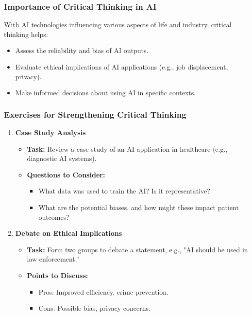 \documentclass[aspectratio=169]{beamer}
\begin{document}
\begin{frame}[fragile]
    \frametitle{Importance of Critical Thinking in AI}
    With AI technologies influencing various aspects of life and industry, critical thinking helps:
    \begin{itemize}
        \item Assess the reliability and bias of AI outputs.
        \item Evaluate ethical implications of AI applications (e.g., job displacement, privacy).
        \item Make informed decisions about using AI in specific contexts.
    \end{itemize}
\end{frame}

\begin{frame}[fragile]
    \frametitle{Exercises for Strengthening Critical Thinking}
    \begin{enumerate}
        \item \textbf{Case Study Analysis}
        \begin{itemize}
            \item \textbf{Task:} Review a case study of an AI application in healthcare (e.g., diagnostic AI systems).
            \item \textbf{Questions to Consider:}
            \begin{itemize}
                \item What data was used to train the AI? Is it representative?
                \item What are the potential biases, and how might these impact patient outcomes?
            \end{itemize}
        \end{itemize}
        
        \item \textbf{Debate on Ethical Implications}
        \begin{itemize}
            \item \textbf{Task:} Form two groups to debate a statement, e.g., "AI should be used in law enforcement."
            \item \textbf{Points to Discuss:}
            \begin{itemize}
                \item Pros: Improved efficiency, crime prevention.
                \item Cons: Possible bias, privacy concerns.
            \end{itemize}
        \end{itemize}
        

\end{enumerate}
\end{frame}
\end{document}
